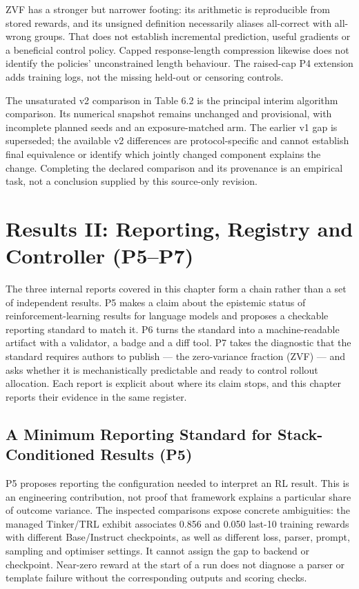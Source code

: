 \documentclass[12pt,a4paper]{report}
\begin{document}
ZVF has a stronger but narrower footing: its arithmetic is reproducible
from stored rewards, and its unsigned definition necessarily aliases
all-correct with all-wrong groups. That does not establish incremental
prediction, useful gradients or a beneficial control policy. Capped
response-length compression likewise does not identify the policies'
unconstrained length behaviour. The raised-cap P4 extension adds
training logs, not the missing held-out or censoring controls.

The unsaturated v2 comparison in Table 6.2 is the principal interim
algorithm comparison. Its numerical snapshot remains unchanged and
provisional, with incomplete planned seeds and an exposure-matched arm.
The earlier v1 gap is superseded; the available v2 differences are
protocol-specific and cannot establish final equivalence or identify
which jointly changed component explains the change. Completing the
declared comparison and its provenance is an empirical task, not a
conclusion supplied by this source-only revision.



\chapter{Results II: Reporting, Registry and Controller
(P5--P7)}\label{results-ii-reporting-registry-and-controller-p5p7}

The three internal reports covered in this chapter form a chain rather
than a set of independent results. P5 makes a claim about the epistemic
status of reinforcement-learning results for language models and
proposes a checkable reporting standard to match it. P6 turns the
standard into a machine-readable artifact with a validator, a badge and
a diff tool. P7 takes the diagnostic that the standard requires authors
to publish --- the zero-variance fraction (ZVF) --- and asks whether it
is mechanistically predictable and ready to control rollout allocation.
Each report is explicit about where its claim stops, and this chapter
reports their evidence in the same register.

\section{A Minimum Reporting Standard for Stack-Conditioned Results
(P5)}\label{a-minimum-reporting-standard-for-stack-conditioned-results-p5}

P5 proposes reporting the configuration needed to interpret an RL
result. This is an engineering contribution, not proof that framework
explains a particular share of outcome variance. The inspected
comparisons expose concrete ambiguities: the managed Tinker/TRL exhibit
associates 0.856 and 0.050 last-10 training rewards with different
Base/Instruct checkpoints, as well as different loss, parser, prompt,
sampling and optimiser settings. It cannot assign the gap to backend or
checkpoint. Near-zero reward at the start of a run does not diagnose a
parser or template failure without the corresponding outputs and scoring
checks.
\end{document}
